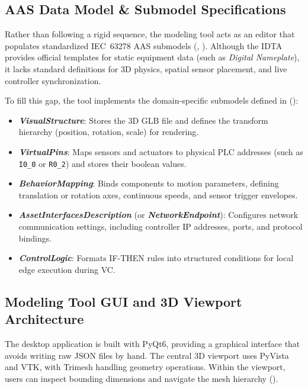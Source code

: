 \subsection{\texorpdfstring{\gls{AAS}}{AAS} Data Model \& Submodel Specifications}
Rather than following a rigid sequence, the modeling tool acts as an editor that populates standardized \gls{IEC}~63278 \gls{AAS} submodels (, ). Although the \gls{IDTA} provides official templates for static equipment data (such as \textit{Digital Nameplate}), it lacks standard definitions for 3D physics, spatial sensor placement, and live controller synchronization.

To fill this gap, the tool implements the domain-specific submodels defined in  ():
\begin{itemize}
    \item \textbf{\textit{VisualStructure}}: Stores the 3D \gls{GLB} file and defines the transform hierarchy (position, rotation, scale) for rendering.
    \item \textbf{\textit{VirtualPins}}: Maps sensors and actuators to physical \gls{PLC} addresses (such as \texttt{I0\_0} or \texttt{R0\_2}) and stores their boolean values.
    \item \textbf{\textit{BehaviorMapping}}: Binds components to motion parameters, defining translation or rotation axes, continuous speeds, and sensor trigger envelopes.
    \item \textbf{\textit{AssetInterfacesDescription}} (or \textbf{\textit{NetworkEndpoint}}): Configures network communication settings, including controller \gls{IP} addresses, ports, and protocol bindings.
    \item \textbf{\textit{ControlLogic}}: Formats IF-THEN rules into structured conditions for local edge execution during \gls{VC}.
\end{itemize}

\subsection{Modeling Tool \texorpdfstring{\gls{GUI}}{GUI} and 3D Viewport Architecture}
The desktop application is built with PyQt6, providing a graphical interface that avoids writing raw \gls{JSON} files by hand. The central 3D viewport uses PyVista and \gls{VTK}, with Trimesh handling geometry operations. Within the viewport, users can inspect bounding dimensions and navigate the mesh hierarchy ().

